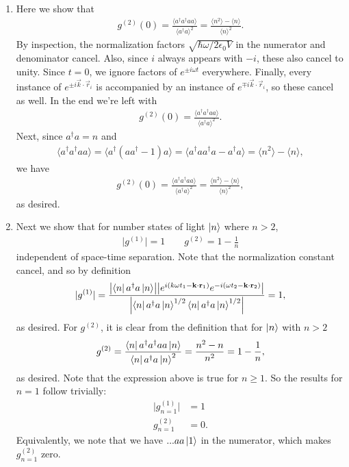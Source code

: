 \documentclass{article}
\theoremstyle{definition}
\newcommand{\f}[2]{\frac{#1}{#2}}
\begin{document}
\begin{enumerate}[label=\alph*)]

\item Here we show that 
\begin{align*}
g^{(2)}(0) = \f{\langle a^\dagger a^\dagger a a  \rangle}{\langle a^\dagger a  \rangle^2}   = \f{\langle n^2 \rangle - \langle n  \rangle}{\langle n \rangle^2}.
\end{align*}
By inspection, the normalization factors $\sqrt{\hbar \omega / 2\epsilon_0 V}$ in the numerator and denominator cancel. Also, since $i$ always appears with $-i$, these also cancel to unity. Since $t = 0$, we ignore factors of $e^{\pm i\omega t}$ everywhere. Finally, every instance of $e^{ \pm i\vec{k}\cdot \vec{r}_i}$ is accompanied by an instance of $e^{\mp i \vec{k} \cdot \vec{r}_i}$, so these cancel as well. In the end we're left with
\begin{align*}
g^{(2)}(0) = \f{\langle a^\dagger a^\dagger a a \rangle }{\langle a^\dagger a \rangle^2}.
\end{align*}
Next, since $a^\dagger a  = n$ and
\begin{align*}
\langle a^\dagger a^\dagger a a \rangle = \langle a^\dagger (aa^\dagger - 1) a \rangle = \langle a^\dagger a a^\dagger a   - a^\dagger a  \rangle = \langle n^2 \rangle - \langle n \rangle,
\end{align*}
we have
\begin{align*}
g^{(2)}(0) = \f{\langle a^\dagger a^\dagger a a  \rangle}{\langle a^\dagger a  \rangle^2}   = \f{\langle n^2 \rangle - \langle n  \rangle}{\langle n \rangle^2},
\end{align*}
as desired. 



\item Next we show that for number states of light $\ket{n}$ where $n > 2$, 
\begin{align*}
\vert g^{(1)} \vert = 1 \quad\quad g^{(2)} = 1 - \f{1}{n}
\end{align*}
independent of space-time separation. Note that the normalization constant cancel, and so by definition
\begin{align*}
\vert g^{(1)}\vert = \f{  \abs{ \bra{n}  a^\dagger a \ket{n}  } 
\abs{ e^{i(k\omega t_1 - \mathbf{k} \cdot \mathbf{r}_1)}  e^{-i(\omega t_2 - \mathbf{k}\cdot \mathbf{r}_2)} }  
}{\abs{\bra{n} a^\dagger a \ket{n}^{1/2} \bra{n} a^\dagger a \ket{n}^{1/2}}} = 1,
\end{align*}
as desired. For $g^{(2)}$, it is clear from the definition that for $\ket{n}$ with $n>2$
\begin{align*}
g^{(2)} = \f{\bra{n}  a^\dagger a^\dagger a a   \ket{n}}{ \bra{n}  a^\dagger a   \ket{n}^2 } = \f{n^2 - n}{n^2} = 1 - \f{1}{n},
\end{align*}
as desired. Note that the expression above is true for $n\geq 1$. So the results for $n=1$ follow trivially:
\begin{align*}
\vert g_{n=1}^{(1)}\vert &= 1 \\
g_{n=1}^{(2)} &= 0.
\end{align*}
Equivalently, we note that we have $...aa\ket{1}$ in the numerator, which makes $g^{(2)}_{n=1}$ zero. 


\end{enumerate}
\end{document}
